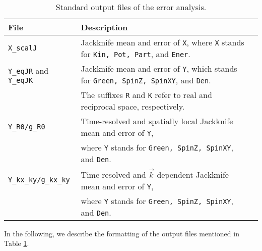 \begin{table}[h]
	\begin{tabular}{@{} l l l @{}}\toprule
		File & Description \\\midrule
		\texttt{X\_scalJ} & Jackknife mean and error of \texttt{X}, where  \texttt{X} stands for \texttt{Kin, Pot, Part}, and \texttt{Ener}.\\
		\texttt{Y\_eqJR} and \texttt{Y\_eqJK} & Jackknife mean and error of \texttt{Y}, which stands for \texttt{Green, SpinZ, SpinXY}, and \texttt{Den}.\\
		& The suffixes \texttt{R} and \texttt{K} refer to real and reciprocal space, respectively.\\
		\texttt{Y\_R0/g\_R0} & Time-resolved and spatially local Jackknife mean and error of \texttt{Y},\\
		& where \texttt{Y} stands for \texttt{Green, SpinZ, SpinXY}, and \texttt{Den}.\\
		\texttt{Y\_kx\_ky/g\_kx\_ky} & Time resolved and $\vec{k}$-dependent Jackknife mean and error of \texttt{Y},\\
		& where \texttt{Y} stands for \texttt{Green, SpinZ, SpinXY}, and \texttt{Den}.\\\bottomrule
	\end{tabular}
	\caption{ Standard output files of the error analysis. \label{table:analysis_output}}
\end{table}
%
In the following, we describe the formatting of the output files mentioned in Table \ref{table:analysis_output}.
